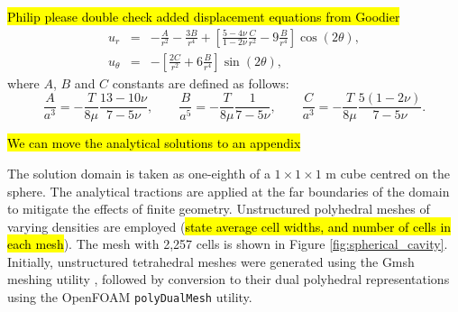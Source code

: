 \documentclass[sn-mathphys,Numbered]{sn-jnl}%
\begin{document}
\hl{Philip please double check added displacement equations from Goodier}
\begin{eqnarray}
u_r &=& -\frac{A}{r^2} - \frac{3B}{r^4} + \left[ \frac{5-4\nu}{1-2\nu} \frac{C}{r^2}-9\frac{B}{r^4} \right]\cos (2\theta),\\
u_{\theta} &=& - \left[ \frac{2C}{r^2} + 6\frac{B}{r^4}  \right]\sin(2\theta),
\end{eqnarray}
where $A$, $B$ and $C$ constants are defined as follows:
\begin{equation}
\frac{A}{a^3} = -\frac{T}{8\mu}\frac{13-10\nu}{7-5\nu}, \qquad
\frac{B}{a^5} = -\frac{T}{8\mu}\frac{1}{7-5\nu}, \qquad
\frac{C}{a^3} = -\frac{T}{8\mu}\frac{5(1-2\nu)}{7-5\nu}.
\end{equation}


\hl{We can move the analytical solutions to an appendix}

The solution domain is taken as one-eighth of a $1 \times 1 \times 1$ m cube centred on the sphere.
The analytical tractions are applied at the far boundaries of the domain to mitigate the effects of finite geometry.
Unstructured polyhedral meshes of varying densities are employed (\hl{state average cell widths, and number of cells in each mesh}).
The mesh with 2,257 cells is shown in Figure \ref{fig:spherical_cavity}.
Initially, unstructured tetrahedral meshes were generated using the Gmsh meshing utility \cite{Geuzaine2009}, followed by conversion to their dual polyhedral representations using the OpenFOAM \texttt{polyDualMesh} utility.
\end{document}
